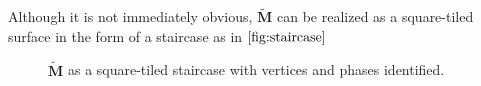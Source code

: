 \documentclass[]{article}
\newtheorem{thm}{Theorem}[subsection]
\newtheorem{Def}{Definition}[subsection]
\begin{document}
Although it is not immediately obvious, $\tilde{\mathbf{M}}$ can be realized as a square-tiled surface in the form of a staircase as in $\ref{fig:staircase}$


\begin{figure}[H]
\centering

\caption{$\tilde{\mathbf{M}}$ as a square-tiled staircase with vertices and phases identified.}
\label{fig:staircase}
\end{figure}


%
%
%
%
\end{document}

